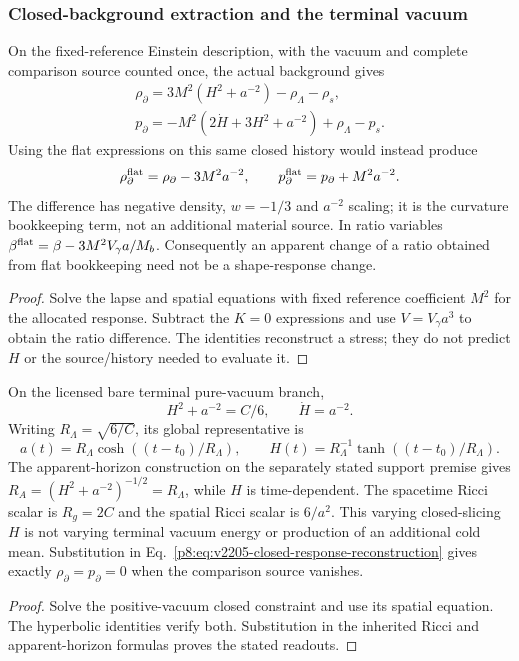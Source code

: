 \documentclass[12pt,a4paper]{article}
\begin{document}
\subsubsection{Closed-background extraction and the terminal vacuum}
\begin{proposition}
\label{p8:prop:v2205-closed-response-reconstruction}
On the fixed-reference Einstein description, with the vacuum and complete
comparison source counted once, the actual background gives
\begin{align}
\label{p8:eq:v2205-closed-response-reconstruction}
 \boxed{\rho_\partial
 =3M^2(H^2+a^{-2})-\rho_\Lambda-\rho_s,}\\
 \boxed{p_\partial
 =-M^2(2\dot H+3H^2+a^{-2})+\rho_\Lambda-p_s.}\nonumber
\end{align}
Using the flat expressions on this same closed history would instead
produce
\begin{equation}
\label{p8:eq:v2205-flat-misallocation}
 \rho_\partial^{\rm flat}=\rho_\partial-3M^2a^{-2},\qquad
 p_\partial^{\rm flat}=p_\partial+M^2a^{-2}.
\end{equation}
The difference has negative density, $w=-1/3$ and $a^{-2}$ scaling;
it is the curvature bookkeeping term, not an additional material source.
In ratio variables
$\beta^{\rm flat}=\beta-3M^2V_\gamma a/M_b$.
Consequently an apparent change of a ratio obtained from flat
bookkeeping need not be a shape-response change.
\end{proposition}
\begin{proof}
Solve the lapse and spatial equations with fixed reference coefficient
$M^2$ for the allocated response. Subtract the $K=0$ expressions and
use $V=V_\gamma a^3$ to obtain the ratio difference.
The identities reconstruct a stress; they do not predict $H$ or the
source/history needed to evaluate it.
\end{proof}

\begin{corollary}
\label{p8:cor:v2205-closed-vacuum-fixed-floor}
On the licensed bare terminal pure-vacuum branch,
\[
 H^2+a^{-2}=C/6,\qquad \dot H=a^{-2}.
\]
Writing $R_\Lambda=\sqrt{6/C}$, its global representative is
\[
 a(t)=R_\Lambda\cosh((t-t_0)/R_\Lambda),\qquad
 H(t)=R_\Lambda^{-1}\tanh((t-t_0)/R_\Lambda).
\]
The apparent-horizon construction on the separately stated support
premise gives $R_A=(H^2+a^{-2})^{-1/2}=R_\Lambda$, while $H$ is
time-dependent. The spacetime Ricci scalar is $R_g=2C$ and the spatial
Ricci scalar is $6/a^2$.
This varying closed-slicing $H$ is not varying terminal vacuum energy
or production of an additional cold mean. Substitution in
Eq.~\eqref{p8:eq:v2205-closed-response-reconstruction} gives exactly
$\rho_\partial=p_\partial=0$ when the comparison source vanishes.
\end{corollary}
\begin{proof}
Solve the positive-vacuum closed constraint and use its spatial equation.
The hyperbolic identities verify both. Substitution in the inherited
Ricci and apparent-horizon formulas proves the stated readouts.
\end{proof}
\end{document}
